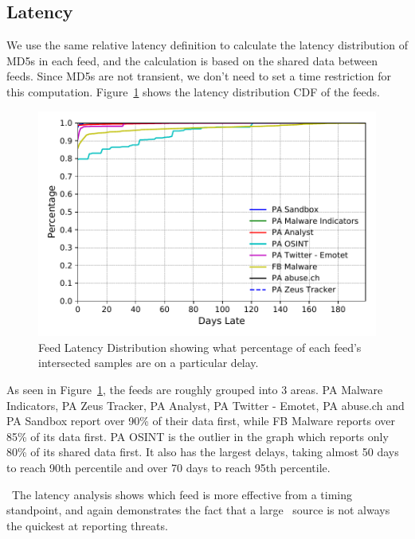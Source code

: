\subsection{Latency}
\label{sec:hash-timing}

We use the same relative latency definition to calculate the latency distribution of MD5s in each feed, and the calculation is based on the shared data between feeds. Since MD5s are not transient, we don't need to set a time restriction for this computation. Figure~\ref{fig:md5-latency} shows the latency distribution CDF of the feeds.

\begin{figure}[h]
\includegraphics[width=0.9\columnwidth]{images/md5_lateDay.pdf}
\caption{Feed Latency Distribution showing what percentage of each feed's intersected samples are on a particular delay.}
\label{fig:md5-latency}
\end{figure}

As seen in Figure~\ref{fig:md5-latency}, the feeds are roughly grouped into 3 areas. {PA Malware Indicators}, {PA Zeus Tracker}, {PA Analyst}, {PA Twitter - Emotet}, {PA abuse.ch} and {PA Sandbox} report over 90\% of their data first, while {FB Malware }reports over 85\% of its data first. PA OSINT is the outlier in the graph which reports only 80\% of its shared data first. It also has the largest delays, taking almost 50 days to reach 90th percentile and over 70 days to reach 95th percentile.

\finding\ The latency analysis shows which feed is more effective from a timing standpoint, and again demonstrates the fact that a large \ti\ source is not always the quickest at reporting threats.
